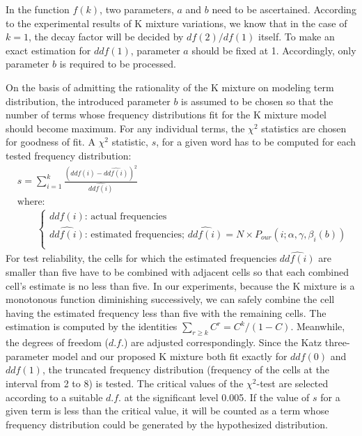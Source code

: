 \documentclass[english]{jnlp_1.4_rep}
\begin{document}
In the function $f(k)$, two parameters, $a$ and $b$ need to be ascertained. According to the experimental results of K mixture variations, we know
that in the case of $k=1$, the decay factor will be decided by $\mathit{df}(2)/ \mathit{df}(1)$ itself. To make an exact estimation for
$\mathit{ddf}(1)$, parameter $a$ should be fixed at 1. Accordingly, only parameter $b$ is required to be processed.

On the basis of admitting the rationality of the K mixture on modeling term distribution, the introduced parameter $b$ is assumed to be chosen so
that the number of terms whose frequency distributions fit for the K mixture model should become maximum. For any individual terms, the $\chi^{2}$
statistics are chosen for goodness of fit. A $\chi^{2}$ statistic, $s$, for a given word has to be computed for each tested frequency distribution:
\begin{align*}
 & s=\sum\nolimits_{i = 1}^k {\frac{(\mathit{ddf}(i) - \hat{\mathit{ddf}(i)})^2}{\hat{\mathit{ddf}(i)}}}  \\
 &  \mbox{where:} \\
 & \qquad 
  \left\{\begin{array}{l}
	\mbox{$\mathit{ddf}(i)$: actual frequencies} \\
	\mbox{$\hat{\mathit{ddf}(i)}$: estimated frequencies; $\hat{\mathit{ddf}(i)}=N\times P_{our}(i;\alpha,\gamma,\beta_{i}(b))$ } \\
	\end{array}\right.
\end{align*}
For test reliability, the cells for which the estimated frequencies $\hat{\mathit{ddf}(i)}$ are smaller than five have to be combined with adjacent
cells so that each combined cell's estimate is no less than five. In our experiments, because the K mixture is a monotonous function diminishing
successively, we can safely combine the cell having the estimated frequency less than five with the remaining cells. The estimation is computed by
the identities $\sum_{r\ge k}C^{r}=C^{k}/(1-C)$. Meanwhile, the degrees of freedom ($d.f.$) are adjusted correspondingly. Since the Katz
three-parameter model and our proposed K mixture both fit exactly for $\mathit{ddf}(0)$ and $\mathit{ddf}(1)$, the truncated frequency distribution
(frequency of the cells at the interval from 2 to 8) is tested. The critical values of the $\chi^{2}$-test are selected according to a suitable
$d.f.$ at the significant level 0.005. If the value of $s$ for a given term is less than the critical value, it will be counted as a term whose
frequency distribution could be generated by the hypothesized distribution.
\end{document}
